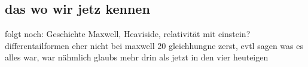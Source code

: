 \subsection{das wo wir jetz kennen}

folgt noch: Geschichte Maxwell,
Heaviside,
relativität mit einstein?
differentailformen eher nicht
bei maxwell 20 gleichhungne zerst, evtl sagen was es alles war, war nähmlich glaubs mehr drin als jetzt in den vier heuteigen




